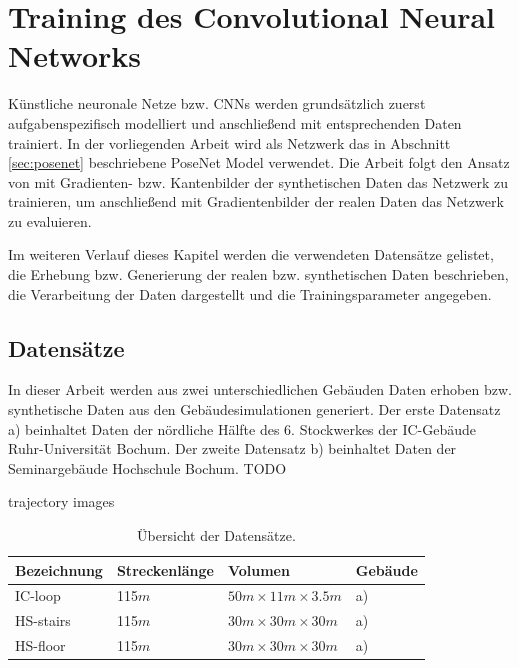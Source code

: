 
\section{Training des Convolutional Neural Networks}
Künstliche neuronale Netze bzw. CNNs werden grundsätzlich zuerst aufgabenspezifisch modelliert und anschließend mit entsprechenden Daten trainiert.  In der vorliegenden Arbeit wird als Netzwerk das in Abschnitt \ref{sec:posenet} beschriebene PoseNet Model verwendet. Die Arbeit folgt den Ansatz von \citet{acharyaBIMPoseNetIndoorCamera2019} mit Gradienten- bzw. Kantenbilder der synthetischen Daten das Netzwerk zu trainieren, um anschließend mit Gradientenbilder der realen Daten das Netzwerk zu evaluieren. 

Im weiteren Verlauf dieses Kapitel werden die verwendeten Datensätze gelistet, die Erhebung bzw. Generierung der realen bzw. synthetischen Daten beschrieben, die Verarbeitung der Daten dargestellt und die Trainingsparameter angegeben. 


\subsection{Datensätze}
\label{subsec:datasets}
In dieser Arbeit werden aus zwei unterschiedlichen Gebäuden Daten erhoben bzw. synthetische Daten aus den Gebäudesimulationen generiert. 
Der erste Datensatz a) beinhaltet Daten der nördliche Hälfte des 6. Stockwerkes der IC-Gebäude Ruhr-Universität Bochum. Der zweite Datensatz b) beinhaltet Daten der Seminargebäude Hochschule Bochum.
TODO

trajectory images


\begin{table}[H]
	\centering
	\caption{Übersicht der Datensätze.}
	\begin{tabularx}{1.0\textwidth}{X X X >{\centering\arraybackslash}p{1.7cm} }
		\textbf{Bezeichnung} & \textbf{Streckenlänge} & \textbf{Volumen} & \textbf{Gebäude}\\
		\hline
		IC-loop & 115$m$ & $50m \times 11m \times 3.5m$ & a) \\
		\hline
		HS-stairs & 115$m$ & $30m \times 30m \times 30m$ & a)\\
		\hline
		HS-floor & 115$m$ & $30m \times 30m \times 30m$ & a)\\
	\end{tabularx}
	\label{tab:dataset_metrics}
\end{table}

